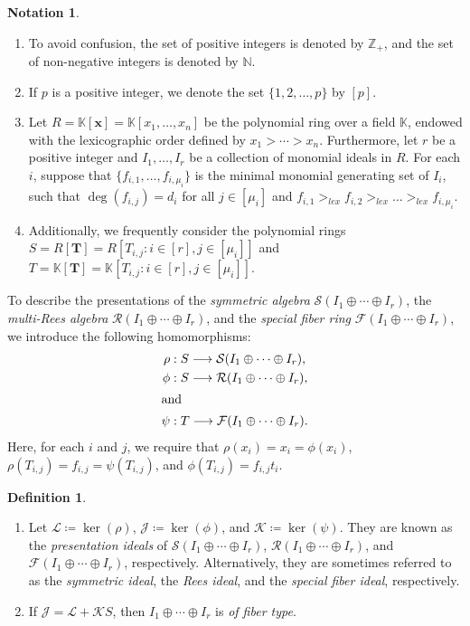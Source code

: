 \documentclass[11pt,a4paper,reqno,dvipsnames]{amsart}
\theoremstyle{plain}
\theoremstyle{definition}
\newtheorem{Assumptions and Discussion}[Theorem]{Assumptions and Discussion}
\newtheorem{Definition}[Theorem]{Definition}
\newtheorem{Notation}[Theorem]{Notation}
\theoremstyle{remark}
\def\deg{\operatorname{deg}}
\def\ker{\operatorname{ker}}
\def\KK{{\mathbb K}}
\def\NN{{\mathbb N}}
\def\ZZ{{\mathbb Z}}
\newcommand\bdT{{\bm T}}
\newcommand\bdx{{\bm x}}
\begin{document}
\begin{Notation}
    \label{notation:collection}
    \begin{enumerate}
        \item To avoid confusion, the set of positive integers is denoted by $\ZZ_+$, and the set of non-negative integers is denoted by $\NN$.
        \item If $p$ is a positive integer, we denote the set $\{1,2,\dots,p\}$ by $[p]$.
        \item Let $R = \KK[\bdx] = \KK[x_1,\ldots,x_{n}]$ be the polynomial ring over a field $\KK$, endowed with the lexicographic order defined by $x_1>\cdots >x_n$. Furthermore, let $r$ be a positive integer and $I_1, \dots, I_r$ be a collection of monomial ideals in $R$. For each $i$, suppose that $\{f_{i,1}, \dots,f_{i,\mu_i}\}$ is the minimal monomial generating set of $I_i$, such that $\deg (f_{i,j})=d_i$ for all $j \in[\mu_i]$ and $f_{i,1} >_{lex} f_{i,2} >_{lex} \dots >_{lex} f_{i,\mu_i}$.
        \item Additionally, we frequently consider the polynomial rings $S = R[\mathbf{T}]=R[T_{i,j}:i\in [r],j\in [\mu_i]]$ and $T= \KK[\bdT]= \KK[T_{i,j}:i\in [r],j\in [\mu_i]]$.
    \end{enumerate}
\end{Notation}

To describe the presentations of the \emph{symmetric algebra} $\mathcal{S}(I_1 \oplus \cdots \oplus I_r)$, the \emph{multi-Rees algebra} $\mathcal{R}(I_1 \oplus \cdots \oplus I_r)$, and the \emph{special fiber ring} $\mathcal{F}(I_1 \oplus \cdots \oplus I_r)$, we introduce the following homomorphisms:
\begin{align*}
    \rho&: S \longrightarrow \mathcal{S}(I_1 \oplus \cdots \oplus I_r),\\
    \phi&: S \longrightarrow \mathcal{R}(I_1 \oplus \cdots \oplus I_r),\\
    \intertext{and}
    \psi&: T \longrightarrow \mathcal{F}(I_1 \oplus \cdots \oplus I_r).
\end{align*}
Here, for each $i$ and $j$, we require that $\rho(x_{i}) = x_{i}=\phi(x_{i})$, $\rho(T_{i,j})=f_{i,j}=\psi(T_{i,j})$, and $\phi(T_{i,j})=f_{i,j} t_i$.


\begin{Definition}
    \begin{enumerate}[a]
        \item Let $\mathcal{L}\coloneqq \ker(\rho)$, $\mathcal{J}\coloneqq \ker(\phi)$, and $\mathcal{K}\coloneqq \ker (\psi)$.
            They are known as the \emph{presentation ideals} of $\mathcal{S}(I_1 \oplus \cdots \oplus I_r)$, $\mathcal{R}(I_1 \oplus \cdots \oplus I_r)$, and $\mathcal{F}(I_1 \oplus \cdots \oplus I_r)$, respectively. Alternatively, they are sometimes referred to as the \emph{symmetric ideal}, the \emph{Rees ideal}, and the \emph{special fiber ideal}, respectively.
        \item 
            If $\mathcal{J}=\mathcal{L}+\mathcal{K}S$, then $I_1 \oplus \cdots \oplus I_r$ is \emph{of fiber type}.  
    \end{enumerate}
\end{Definition}
\end{document}
